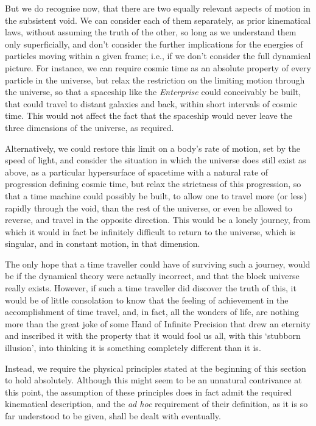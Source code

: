 But we do recognise now, that there are two equally relevant aspects of motion in the subsistent void. We can consider each of them separately, as prior kinematical laws, without assuming the truth of the other, so long as we understand them only superficially, and don't consider the further implications for the energies of particles moving within a given frame; i.e., if we don't consider the full dynamical picture. For instance, we can require cosmic time as an absolute property of every particle in the universe, but relax the restriction on the limiting motion through the universe, so that a spaceship like the \textit{Enterprise} could conceivably be built, that could travel to distant galaxies and back, within short intervals of cosmic time. This would not affect the fact that the spaceship would never leave the three dimensions of the universe, as required.

Alternatively, we could restore this limit on a body's rate of motion, set by the speed of light, and consider the situation in which the universe does still exist as above, as a particular hypersurface of spacetime with a natural rate of progression defining cosmic time, but relax the strictness of this progression, so that a time machine could possibly be built, to allow one to travel more (or less) rapidly through the void, than the rest of the universe, or even be allowed to reverse, and travel in the opposite direction. This would be a lonely journey, from which it would in fact be infinitely difficult to return to the universe, which is singular, and in constant motion, in that dimension. 

The only hope that a time traveller could have of surviving such a journey, would be if the dynamical theory were actually incorrect, and that the block universe really exists. However, if such a time traveller did discover the truth of this, it would be of little consolation to know that the feeling of achievement in the accomplishment of time travel, and, in fact, all the wonders of life, are nothing more than the great joke of some Hand of Infinite Precision that drew an eternity and inscribed it with the property that it would fool us all, with this `stubborn illusion', into thinking it is something completely different than it is.

Instead, we require the physical principles stated at the beginning of this section to hold absolutely. Although this might seem to be an unnatural contrivance at this point, the assumption of these principles does in fact admit the required kinematical description, and the \textit{ad hoc} requirement of their definition, as it is so far understood to be given, shall be dealt with eventually.

